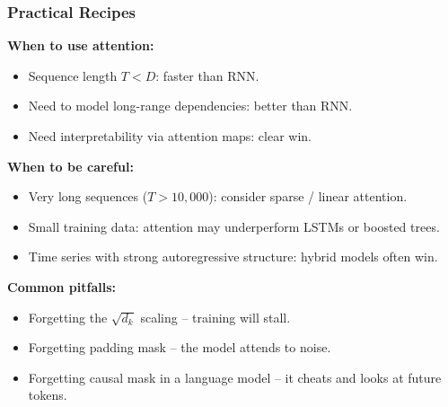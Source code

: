 \documentclass[notes,11pt, aspectratio=169]{beamer}
\begin{document}
\begin{frame}
\frametitle{Practical Recipes}

\textbf{When to use attention:}
\begin{itemize}
    \item Sequence length $T < D$: faster than RNN.
    \item Need to model long-range dependencies: better than RNN.
    \item Need interpretability via attention maps: clear win.
\end{itemize}

\vspace{6pt}
\textbf{When to be careful:}
\begin{itemize}
    \item Very long sequences ($T > 10{,}000$): consider sparse / linear attention.
    \item Small training data: attention may underperform LSTMs or boosted trees.
    \item Time series with strong autoregressive structure: hybrid models often win.
\end{itemize}

\vspace{8pt}
\textbf{Common pitfalls:}
\begin{itemize}
    \item Forgetting the $\sqrt{d_k}$ scaling -- training will stall.
    \item Forgetting padding mask -- the model attends to noise.
    \item Forgetting causal mask in a language model -- it cheats and looks at future tokens.
\end{itemize}
\end{frame}
\end{document}
